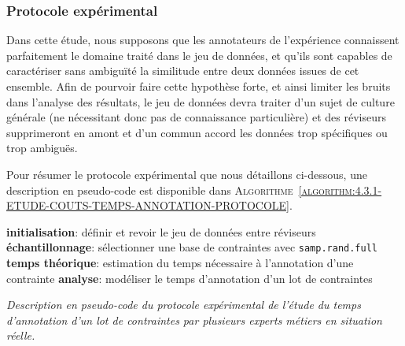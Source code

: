 		\subsubsection{Protocole expérimental}
			
			\begin{leftBarWarning}
				Dans cette étude, nous supposons que les annotateurs de l'expérience connaissent parfaitement le domaine traité dans le jeu de données, et qu'ils sont capables de caractériser sans ambiguïté la similitude entre deux données issues de cet ensemble.
				Afin de pourvoir faire cette hypothèse forte, et ainsi limiter les bruits dans l'analyse des résultats, le jeu de données devra traiter d'un sujet de culture générale (ne nécessitant donc pas de connaissance particulière) et des réviseurs supprimeront en amont et d'un commun accord les données trop spécifiques ou trop ambiguës.
			\end{leftBarWarning}
			
			Pour résumer le protocole expérimental que nous détaillons ci-dessous, une description en pseudo-code est disponible dans \textsc{Algorithme~\ref{algorithm:4.3.1-ETUDE-COUTS-TEMPS-ANNOTATION-PROTOCOLE}}.

			\begin{algorithm}
				\textbf{initialisation}: définir et revoir le jeu de données entre réviseurs \;
				\textbf{échantillonnage}: sélectionner une base de contraintes avec \texttt{samp.rand.full} \;
				\textbf{temps théorique}: estimation du temps nécessaire à l'annotation d'une contrainte \;
				\textbf{analyse}: modéliser le temps d'annotation d'un lot de contraintes \;
				\caption{\textit{
					Description en pseudo-code du protocole expérimental de l'étude du temps d'annotation d'un lot de contraintes par plusieurs experts métiers en situation réelle.
				}}
				\label{algorithm:4.3.1-ETUDE-COUTS-TEMPS-ANNOTATION-PROTOCOLE}
			\end{algorithm}
			
